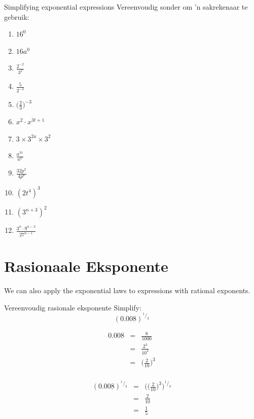 \begin{exercises}{Simplifying exponential expressions}
Vereenvoudig sonder om ’n sakrekenaar te gebruik:
\begin{multicols}{2}
\begin{enumerate}[noitemsep, label=\textbf{\arabic*}., itemsep=5pt]
 \item $16^0$
 \item $16a^0$
 \item $\frac{2^{-2}}{3^2}$
 \item $ \frac{5}{2^{-3}}$
 \item $ \Big(\frac{2}{3}\Big)^{-3} $
 \item $ x^2 \cdot x^{3t+1} $
 \item $ 3 \times 3^{2a} \times 3^2$
 \item $ \frac{a^{3x}}{a^x} $
 \item $ \frac{32p^2}{4p^8}$
 \item $ (2t^4)^3$
 \item $ (3^{n+3})^2$
 \item $ \frac{3^n \cdot 9^{n-3}}{27^{n-1}}$
\end{enumerate}
\end{multicols}

 






\end{exercises}




\section{Rasionaale Eksponente}

We can also apply the exponential laws to expressions with rational exponents.

\begin{wex}
{%
Vereenvoudig rasionale eksponente
} 
{%
Simplify: 
$$ (0.008)^{^1/_3} $$
}
{%

\begin{eqnarray*}
 0.008 & = & \frac{8}{1000} \\
       & = & \frac{2^3}{10^3} \\
       & = & \Big(\frac{2}{10}\Big)^3\\
\end{eqnarray*}

\begin{eqnarray*}
 (0.008)^{^1/_3} & = & \Big(\Big(\frac{2}{10}\Big)^3\Big)^{^1/_3} \\
		 & = & \frac{2}{10} \\
		 & = & \frac{1}{5}
\end{eqnarray*}
}
\end{wex}

